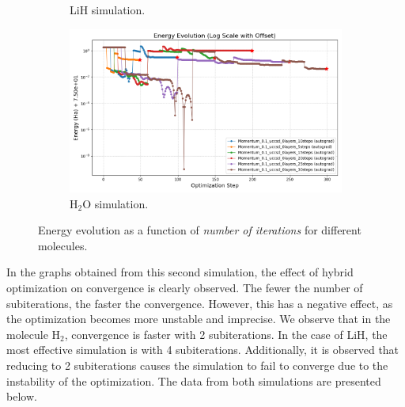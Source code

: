 \begin{figure}[H]
\begin{subfigure}{0.45\textwidth}
    \caption{LiH simulation.}
    \label{fig:num_iterations_final_lih}
  \end{subfigure}
  \begin{subfigure}{0.45\textwidth}
    \includegraphics[width=\textwidth]{data/NumIterations/results_H2O/energy_evolution_log_offset.png}
    \caption{H$_2$O simulation.}
    \label{fig:num_iterations_final_h2o}
  \end{subfigure}
  \caption{Energy evolution as a function of \textit{number of iterations} for different molecules.}
  \label{fig:num_iterations_final_results}
\end{figure}
In the graphs obtained from this second simulation, the effect of hybrid optimization on convergence is clearly observed. The fewer the number of subiterations, the faster the convergence. However, this has a negative effect, as the optimization becomes more unstable and imprecise. We observe that in the molecule \(\mathrm{H_2}\), convergence is faster with 2 subiterations. In the case of \(\mathrm{LiH}\), the most effective simulation is with 4 subiterations. Additionally, it is observed that reducing to 2 subiterations causes the simulation to fail to converge due to the instability of the optimization. The data from both simulations are presented below.

